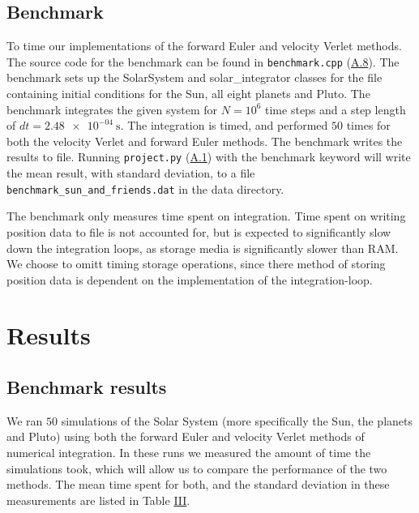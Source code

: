 \documentclass[reprint,english,notitlepage]{revtex4-1}  %
\begin{document}
\subsection{Benchmark} \label{sec:III:e}
To time our implementations of the forward Euler and velocity Verlet methods. The source code for the benchmark can be found in \verb+benchmark.cpp+ (\hyperref[A.8]{A.8}). The benchmark sets up the SolarSystem and solar\_integrator classes for the file containing initial conditions for the Sun, all eight planets and Pluto. The benchmark integrates the given system for \(N = 10^6\) time steps and a step length of \(dt = \SI{2.48e-04}{\second}\). The integration is timed, and performed \(50\) times for both the velocity Verlet and forward Euler methods. The benchmark writes the results to file. Running \verb+project.py+ (\hyperref[A.1]{A.1}) with the benchmark keyword will write the mean result, with standard deviation, to a file \verb+benchmark_sun_and_friends.dat+ in the data directory.

The benchmark only measures time spent on integration. Time spent on writing position data to file is not accounted for, but is expected to significantly slow down the integration loops, as storage media is significantly slower than RAM. We choose to omitt timing storage operations, since there method of storing position data is dependent on the implementation of the integration-loop.

\newpage

\section{Results} \label{sec:IV}

\subsection{Benchmark results} \label{sec:IV:a}

We ran $50$ simulations of the Solar System (more specifically the Sun, the planets and Pluto) using both the forward Euler and velocity Verlet methods of numerical integration. In these runs we measured the amount of time the simulations took, which will allow us to compare the performance of the two methods. The mean time spent for both, and the standard deviation in these measurements are listed in Table \hyperref[table:benchmark]{III}.
\end{document}
